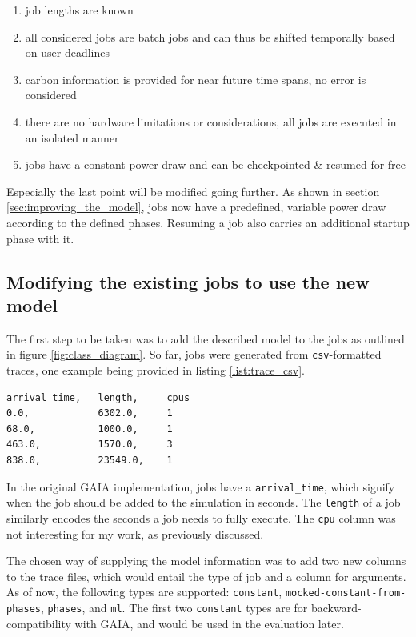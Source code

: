\begin{enumerate}
    \item job lengths are known
    \item all considered jobs are batch jobs and can thus be shifted temporally based on user deadlines
    \item carbon information is provided for near future time spans, no error is considered
    \item there are no hardware limitations or considerations, all jobs are executed in an isolated manner
    \item jobs have a constant power draw and can be checkpointed \& resumed for free
\end{enumerate}

Especially the last point will be modified going further. As shown in section \ref{sec:improving_the_model}, jobs now have a predefined, variable power draw according to the defined phases. Resuming a job also carries an additional startup phase with it.

\subsection{Modifying the existing jobs to use the new model}

The first step to be taken was to add the described model to the jobs as outlined in figure \ref{fig:class_diagram}. 
So far, jobs were generated from \verb|csv|-formatted traces, one example being provided in listing \ref{list:trace_csv}.

\begin{lstlisting}[frame=single, numbers=none, caption={Excerpt from the Alibaba-PAI trace}, label={list:trace_csv}, basicstyle=\ttfamily]
arrival_time,   length,     cpus
0.0,            6302.0,     1
68.0,           1000.0,     1
463.0,          1570.0,     3
838.0,          23549.0,    1
\end{lstlisting}

In the original GAIA implementation, jobs have a \verb|arrival_time|, which signify when the job should be added to the simulation in seconds. 
The \verb|length| of a job similarly encodes the seconds a job needs to fully execute. The \verb|cpu| column was not interesting for my work, as previously discussed.

The chosen way of supplying the model information was to add two new columns to the trace files, which would entail the type of job and a column for arguments. 
As of now, the following types are supported: \verb|constant|, \verb|mocked-constant-from-phases|, \verb|phases|, and \verb|ml|. 
The first two \verb|constant| types are for backward-compatibility with GAIA, and would be used in the evaluation later. 

